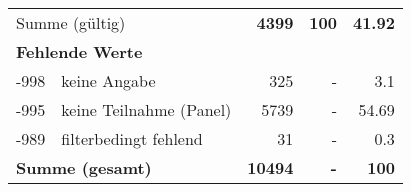 \begin{longtable}{lXrrr}
     \midrule
     \multicolumn{2}{l}{Summe (gültig)} &
       \textbf{\num{4399}} &
     \textbf{100} &
       \textbf{\num[round-mode=places,round-precision=2]{41,92}} \\
     \multicolumn{5}{l}{\textbf{Fehlende Werte}}\\
       -998 &
       keine Angabe &
         \num{325} &
        - &
         \num[round-mode=places,round-precision=2]{3,1} \\
       -995 &
       keine Teilnahme (Panel) &
         \num{5739} &
        - &
         \num[round-mode=places,round-precision=2]{54,69} \\
       -989 &
       filterbedingt fehlend &
         \num{31} &
        - &
         \num[round-mode=places,round-precision=2]{0,3} \\
     \midrule
     \multicolumn{2}{l}{\textbf{Summe (gesamt)}} &
          \textbf{\num{10494}} &
        \textbf{-} &
        \textbf{100} \\
     \bottomrule
     \end{longtable}
     
